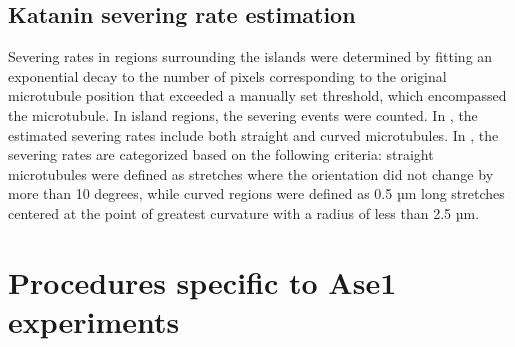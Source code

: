 \subsection{Katanin severing rate estimation}
Severing rates in regions surrounding the islands were determined by fitting an exponential decay to the number of pixels corresponding to the original microtubule position that exceeded a manually set threshold, which encompassed the microtubule. In island regions, the severing events were counted. In , the estimated severing rates include both straight and curved microtubules. In , the severing rates are categorized based on the following criteria: straight microtubules were defined as stretches where the orientation did not change by more than 10 degrees, while curved regions were defined as 0.5 µm long stretches centered at the point of greatest curvature with a radius of less than 2.5 µm.

\section{Procedures specific to Ase1 experiments}
